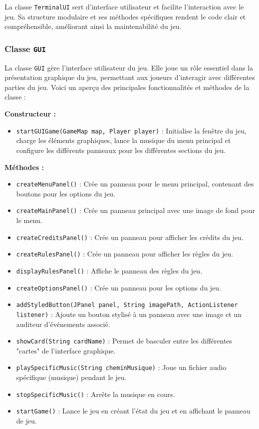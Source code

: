\documentclass{article}
\begin{document}
La classe \texttt{TerminalUI} sert d'interface utilisateur et facilite l'interaction avec le jeu. Sa structure modulaire et ses méthodes spécifiques rendent le code clair et compréhensible, améliorant ainsi la maintenabilité du jeu.



\subsubsection*{Classe \texttt{GUI}}

La classe \texttt{GUI} gère l'interface utilisateur du jeu. Elle joue un rôle essentiel dans la présentation graphique du jeu, permettant aux joueurs d'interagir avec différentes parties du jeu. Voici un aperçu des principales fonctionnalités et méthodes de la classe :

\item \textbf{Constructeur :} 
\begin{itemize}
    \item \texttt{startGUIGame(GameMap map, Player player)} : Initialise la fenêtre du jeu, charge les éléments graphiques, lance la musique du menu principal et configure les différents panneaux pour les différentes sections du jeu.
\end{itemize}

\item \textbf{Méthodes :}
\begin{itemize}
    \item \texttt{createMenuPanel()} : Crée un panneau pour le menu principal, contenant des boutons pour les options du jeu.
    \item \texttt{createMainPanel()} : Crée un panneau principal avec une image de fond pour le menu.
    \item \texttt{createCreditsPanel()} : Crée un panneau pour afficher les crédits du jeu.
    \item \texttt{createRulesPanel()} : Crée un panneau pour afficher les règles du jeu.
    \item \texttt{displayRulesPanel()} : Affiche le panneau des règles du jeu.
    \item \texttt{createOptionsPanel()} : Crée un panneau pour les options du jeu.
    \item \texttt{addStyledButton(JPanel panel, String imagePath, ActionListener listener)} : Ajoute un bouton stylisé à un panneau avec une image et un auditeur d'événements associé.
    \item \texttt{showCard(String cardName)} : Permet de basculer entre les différentes "cartes" de l'interface graphique.
    \item \texttt{playSpecificMusic(String cheminMusique)} : Joue un fichier audio spécifique (musique) pendant le jeu.
    \item \texttt{stopSpecificMusic()} : Arrête la musique en cours.
    \item \texttt{startGame()} : Lance le jeu en créant l'état du jeu et en affichant le panneau de jeu.
\end{itemize}
\end{document}
